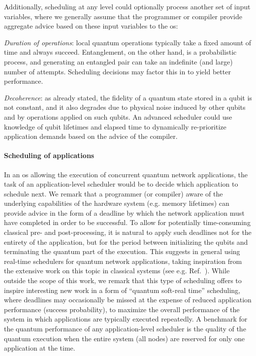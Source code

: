 Additionally, scheduling at any level could optionally process another set of input variables, where
we generally assume that the programmer or compiler provide aggregate advice based on these input
variables to the \acrshort{os}:
%
\begin{inlinelist}
    \item \emph{Duration of operations}: local quantum operations typically take a fixed amount of
          time and always succeed. Entanglement, on the other hand, is a probabilistic process, and
          generating an entangled pair can take an indefinite (and large) number of attempts.
          Scheduling decisions may factor this in to yield better performance.
    \item \emph{Decoherence}: as already stated, the fidelity of a quantum state stored in a qubit
          is not constant, and it also degrades due to physical noise induced by other qubits and by
          operations applied on such qubits. An advanced scheduler could use knowledge of qubit
          lifetimes and elapsed time to dynamically re-prioritize application demands based on the
          advice of the compiler.
\end{inlinelist}

\paragraph{Scheduling of applications}

In an \acrshort{os} allowing the execution of concurrent quantum network applications, the task of
an application-level scheduler would be to decide which application to schedule next. We remark that
a programmer (or compiler) aware of the underlying capabilities of the hardware system (e.g. memory
lifetimes) can provide advice in the form of a deadline by which the network application must have
completed in order to be successful. To allow for potentially time-consuming classical pre- and
post-processing, it is natural to apply such deadlines not for the entirety of the application, but
for the period between initializing the qubits and terminating the quantum part of the execution.
This suggests in general using real-time schedulers for quantum network applications, taking
inspiration from the extensive work on this topic in classical systems (see e.g.
Ref.~\cite{liu_1973_scheduling}). While outside the scope of this work, we remark that this type of
scheduling offers to inspire interesting new work in a form of ``quantum soft-real time''
scheduling, where deadlines may occasionally be missed at the expense of reduced application
performance (success probability), to maximize the overall performance of the system in which
applications are typically executed repeatedly. A benchmark for the quantum performance of any
application-level scheduler is the quality of the quantum execution when the entire system (all
nodes) are reserved for only one application at the time.

